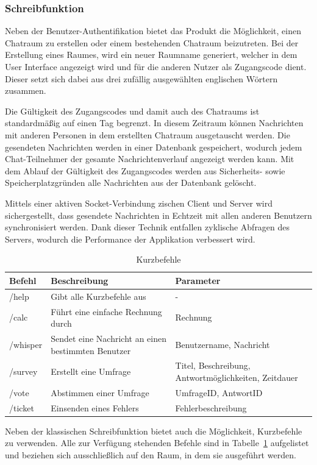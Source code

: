 \subsubsection{Schreibfunktion}
Neben der Benutzer-Authentifikation bietet das Produkt die Möglichkeit, einen Chatraum zu erstellen oder einem bestehenden Chatraum beizutreten.
Bei der Erstellung eines Raumes, wird ein neuer Raumname generiert, welcher in dem User Interface angezeigt wird und für die anderen Nutzer als Zugangscode dient.
Dieser setzt sich dabei aus drei zufällig ausgewählten englischen Wörtern zusammen.

\noindent{}Die Gültigkeit des Zugangscodes und damit auch des Chatraums ist standardmäßig auf einen Tag begrenzt.
In diesem Zeitraum können Nachrichten mit anderen Personen in dem erstellten Chatraum ausgetauscht werden.
Die gesendeten Nachrichten werden in einer Datenbank gespeichert, wodurch jedem Chat-Teilnehmer der gesamte Nachrichtenverlauf angezeigt werden kann.
Mit dem Ablauf der Gültigkeit des Zugangscodes werden aus Sicherheits- sowie Speicherplatzgründen alle Nachrichten aus der Datenbank gelöscht.

\noindent{}Mittels einer aktiven Socket-Verbindung zischen Client und Server wird sichergestellt, dass gesendete Nachrichten in Echtzeit mit allen anderen Benutzern synchronisiert werden.
Dank dieser Technik entfallen zyklische Abfragen des Servers, wodurch die Performance der Applikation verbessert wird.
\newline

\begin{table}
  \centering
  \begin{tabular}{|l|m{.5\linewidth}|m{.32\linewidth}|}
    \hline
    \textbf{Befehl} & \textbf{Beschreibung} & \textbf{Parameter} \\
    \hline
    /help     & Gibt alle Kurzbefehle aus                           & - \\
    \hline
    /calc     & Führt eine einfache Rechnung durch                  & Rechnung \\
    \hline
    /whisper  & Sendet eine Nachricht an einen bestimmten Benutzer  & Benutzername, Nachricht \\
    \hline
    /survey   & Erstellt eine Umfrage                               & Titel, Beschreibung, Antwortmöglichkeiten, Zeitdauer \\
    \hline
    /vote     & Abstimmen einer Umfrage                             & UmfrageID, AntwortID \\
    \hline
    /ticket   & Einsenden eines Fehlers                             & Fehlerbeschreibung \\
    \hline
  \end{tabular}
  \caption{Kurzbefehle}
  \label{tab:Kurzbefehle}
\end{table}
\noindent{}Neben der klassischen Schreibfunktion bietet  auch die Möglichkeit, Kurzbefehle zu verwenden.
Alle zur Verfügung stehenden Befehle sind in Tabelle~\ref{tab:Kurzbefehle} aufgelistet und beziehen sich ausschließlich auf den Raum, in dem sie ausgeführt werden.

